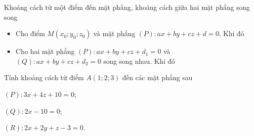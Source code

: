 \begin{dang}{Khoảng cách từ một điểm đến mặt phẳng, khoảng cách giữa hai mặt phẳng song song}
	\begin{itemize}
		\item [\iconMT]  Cho điểm $M(x_0;y_0;z_0)$ và mặt phẳng $(P) \colon ax+by+cz+d=0$. Khi đó
		\item [\iconMT]  	Cho hai mặt phẳng $(P) \colon ax + by + cz + d_1=0$ và $(Q) \colon ax + by + cz + d_2=0$ song song nhau. 
		Khi đó
	\end{itemize}
\end{dang}
\setcounter{ex}{0}
\setcounter{vd}{0}
\viduminhhoa
\begin{vd}%
	Tính khoảng cách từ điểm $A(1;2;3)$ đến các mặt phẳng sau
	\begin{enumEX}[a)]{3}
		\item $\left(P\right) \colon 3x + 4z + 10 = 0$;
		\item $\left(Q\right) \colon 2x - 10 = 0$;
		\item $\left(R\right) \colon 2x + 2y + z - 3 = 0$.
	\end{enumEX}
	
\end{vd}
